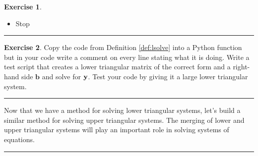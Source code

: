 \documentclass[
]{book}
\providecommand{\tightlist}{%
  \setlength{\itemsep}{0pt}\setlength{\parskip}{0pt}}
\theoremstyle{definition}
\theoremstyle{definition}
\theoremstyle{definition}
\newtheorem{exercise}{Exercise}[chapter]
\theoremstyle{remark}
\begin{document}
\begin{exercise}
\begin{itemize}
  \begin{itemize}
  \tightlist
  \item
    What does \texttt{y{[}2{]}} get initialized to?
  \item
    Enter the inner loop at \texttt{j=0}:

    \begin{itemize}
    \tightlist
    \item
      What does \texttt{y{[}2{]}} become when \texttt{j=0}?
    \end{itemize}
  \item
    Increment the inner loop to \texttt{j=1}:

    \begin{itemize}
    \tightlist
    \item
      What does \texttt{y{[}2{]}} become when \texttt{j=1}?
    \end{itemize}
  \end{itemize}
\item
  Stop
\end{itemize}
\end{exercise}

\begin{center}\rule{0.5\linewidth}{0.5pt}\end{center}

\begin{exercise}
\protect\hypertarget{exr:unnamed-chunk-327}{}{\label{exr:unnamed-chunk-327} }Copy the code from Definition \ref{def:lsolve} into a Python function but in your code write a comment on every line stating what it is doing. Write a test script that creates a lower triangular matrix of the correct form and a right-hand side \(\boldsymbol{b}\) and solve for \({\bf y}\). Test your code by giving it a large lower triangular system.
\end{exercise}

\begin{center}\rule{0.5\linewidth}{0.5pt}\end{center}

Now that we have a method for solving lower triangular systems, let's build a similar method for solving upper triangular systems. The merging of lower and upper triangular systems will play an important role in solving systems of equations.

\begin{center}\rule{0.5\linewidth}{0.5pt}\end{center}
\end{document}
